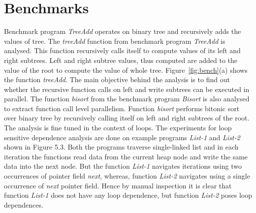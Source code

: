 \section{Benchmarks}
Benchmark program \emph{TreeAdd} operates on binary tree and recursively adds the 
values of tree. The \emph{treeAdd} function from benchmark 
program \emph{TreeAdd} is analysed. This function  
recursively calls itself to compute values of its left and right subtrees. 
Left and right subtree values, thus computed are added to the value of the 
root to compute the value of whole tree. Figure~\ref{fig:bench}(a)  
shows the function \emph{treeAdd}. 
The main objective behind the analysis is to find out 
whether the recursive function calls on left and write subtrees 
can be executed in parallel. 
The function \emph{bisort} from the benchmark program \emph{Bisort} 
is also analysed to extract function call level parallelism. Function \emph{bisort} 
performs bitonic sort over binary tree by recursively calling itself on left and right subtrees 
of the root. 
The analysis is fine tuned in the context of loops. The experiments for loop sensitive 
dependence analysis are done on example programs \emph{List-1} and \emph{List-2} shown in 
Figure 5.3. Both the programs traverse single-linked list and in each iteration the functions  
read data from the current heap node and write the same data into the next node. But the function \emph{List-1} navigates iterations using two occurrences of pointer field \emph{next}, whereas,  function \emph{List-2} navigates using a single occurrence of \emph{next} pointer field. 
Hence by manual inspection it is clear that function \emph{List-1} does not have any loop  
dependence, but function \emph{List-2} poses loop dependences. 
